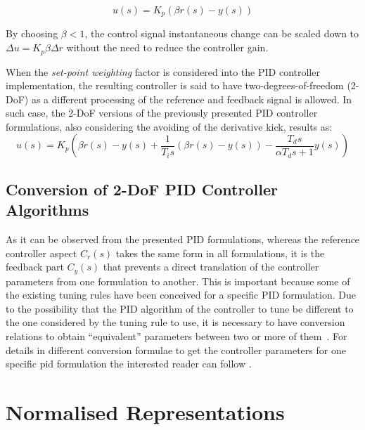 \begin{equation}
u(s)=K_p(\beta r(s) - y(s))
\end{equation}

By choosing $\beta < 1$, the control signal instantaneous change can be scaled down to $\Delta u = K_p \beta \Delta r$  without the need to reduce the controller gain. 

When the \emph{set-point weighting} factor is considered into the PID controller implementation, the resulting controller is said to have two-degrees-of-freedom (2-DoF) as a different processing of the reference and feedback signal is allowed. In such case, the 2-DoF versions of the previously presented PID controller formulations, also considering the avoiding of the derivative kick, results as:
\begin{equation}
u(s)= K_p \left( \beta r(s) - y(s) + \frac{1}{T_i s} (\beta r(s) - y(s)) - \frac{T_ds}{\alpha T_d s+1} y(s) \right )
\label{eq:PIDstandard2DoF}
\end{equation}

\subsection{Conversion of 2-DoF PID Controller Algorithms}
As it can be observed from the presented PID formulations, whereas the reference controller aspect $C_r(s)$ takes the same form in all formulations, it is the feedback part $C_y(s)$  that prevents a direct translation of the controller parameters from one formulation to another. This is important because some of the existing tuning rules have been conceived for a specific PID formulation. Due to the possibility that the PID algorithm of the controller to tune be different to the one considered by the tuning rule to use, it is necessary to have conversion relations to obtain ``equivalent'' parameters between two or more of them~\citep{alfaroetfa2012-2, vilanova2017WEE}.  For details in different conversion formulae to get the controller parameters for one specific \gls{pid} formulation the interested reader can follow \citet{Alfaro2016}.


\section{Normalised Representations}
\label{sec:4}

